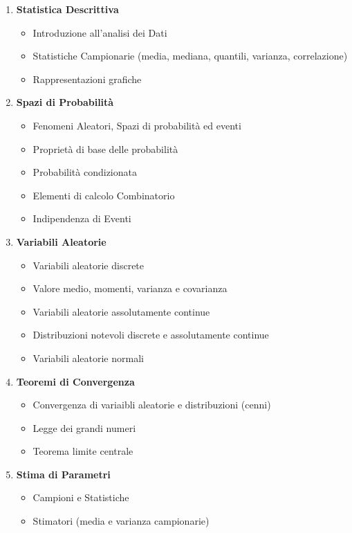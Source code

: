 \begin{enumerate}
    \item \textbf{Statistica Descrittiva}
    \begin{itemize}
        \item Introduzione all'analisi dei Dati
        \item Statistiche Campionarie (media, mediana, quantili, varianza, correlazione)
        \item Rappresentazioni grafiche
    \end{itemize}
    \item \textbf{Spazi di Probabilità}
    \begin{itemize}
        \item Fenomeni Aleatori, Spazi di probabilità ed eventi
        \item Proprietà di base delle probabilità
        \item Probabilità condizionata
        \item Elementi di calcolo Combinatorio
        \item Indipendenza di Eventi
    \end{itemize}
    \item \textbf{Variabili Aleatorie}
    \begin{itemize}
        \item Variabili aleatorie discrete
        \item Valore medio, momenti, varianza e covarianza
        \item Variabili aleatorie assolutamente continue
        \item Distribuzioni notevoli discrete e assolutamente continue
        \item Variabili aleatorie normali
    \end{itemize}
    \item \textbf{Teoremi di Convergenza}
    \begin{itemize}
        \item Convergenza di variaibli aleatorie e distribuzioni (cenni)
        \item Legge dei grandi numeri
        \item Teorema limite centrale
    \end{itemize}
    \item \textbf{Stima di Parametri}
    \begin{itemize}
        \item Campioni e Statistiche
        \item Stimatori (media e varianza campionarie)

\end{itemize}
\end{enumerate}
